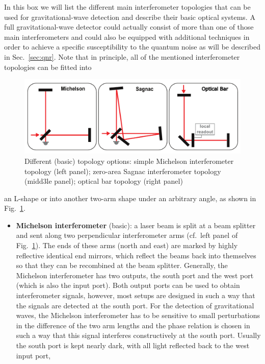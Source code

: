{In this box we will list the different main interferometer
topologies that can be used for gravitational-wave detection and
describe their basic optical systems. A full gravitational-wave
detector could actually consist of more than one of those main
interferometers and could also be equipped with additional
techniques in order to achieve a specific susceptibility to the
quantum noise as will be described in Sec.~\ref{sec:qnr}.
Note that in principle, all of the mentioned interferometer
topologies can be fitted into
\begin{figure}[H]
\centering
\includegraphics[width=15cm]{./Sec_Optics/Lshape.pdf}
\caption{Different (basic) topology options: simple Michelson
interferometer topology (left panel); zero-area Sagnac
interferometer topology (midd3le panel); optical bar topology
(right panel)
}\label{Fig:Lshape}
\end{figure}
an L-shape or into another two-arm shape under an arbitrary angle,
as shown in Fig.~\ref{Fig:Lshape}.
\begin{itemize}
\item {\bf Michelson interferometer} (basic): a laser beam is
split at a beam splitter and sent along two perpendicular
interferometer arms (cf.\ left panel of Fig.~\ref{Fig:Lshape}). The
ends of these arms (north and east) are marked by highly
reflective identical end mirrors, which reflect the beams back
into themselves so that they can be recombined at the beam
splitter. Generally, the Michelson interferometer has two outputs,
the south port and the west port (which is also the input port).
Both output ports can be used to obtain interferometer signals,
however, most setups are designed in such a way that the signals
are detected at the south port. For the detection of gravitational
waves, the Michelson interferometer has to be sensitive to small
perturbations in the difference of the two arm lengths and the
phase relation is chosen in such a way that this signal interferes
constructively at the south port.
Usually the south port is kept
nearly dark, with all light reflected back to the west input port,

\end{itemize}}
